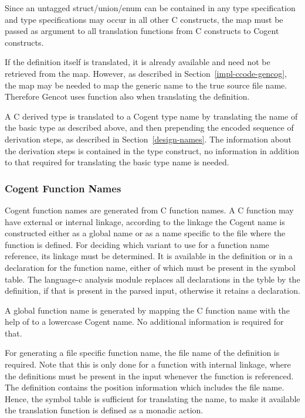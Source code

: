 Since an untagged struct/union/enum can be contained in any type specification and type specifications
may occur in all other C constructs, the  map must be passed as argument to all translation
functions from C constructs to Cogent constructs.

If the definition itself is translated, it is already available and need not be retrieved from the map. 
However, as described in Section~\ref{impl-ccode-gencog}, the map may be needed to map the generic name
 to the true source file name. Therefore Gencot uses function  also when
translating the definition.

A C derived type is translated to a Cogent type name by translating the name of the basic type as described
above, and then prepending the encoded sequence of derivation steps, as
described in Section~\ref{design-names}. The information about the derivation steps is contained in the 
type construct, no information in addition to that required for translating the basic type name is needed.

\subsubsection{Cogent Function Names}

Cogent function names are generated from C function names. A C function may have external or internal
linkage, according to the linkage the Cogent name is constructed either as a global name or as a name specific
to the file where the function is defined. For deciding which variant to use for a function name reference,
its linkage must be determined. It is available in the definition or in a declaration for the function name,
either of which must be present in the symbol table. The language-c analysis module replaces all 
declarations in the tyble by the
definition, if that is present in the parsed input, otherwise it retains a declaration. 

A global function name is generated by mapping the C function name with the help of  to
a lowercase Cogent name. No additional information is required for that.

For generating a file specific function name, the file name of the definition is required. Note that 
this is only done for a function with internal linkage, where the definitions must be present in
the input whenever the function is referenced. The definition contains the position information
which includes the file name. Hence, the symbol table is sufficient for translating the name,
to make it available the translation function is defined as a monadic action.

